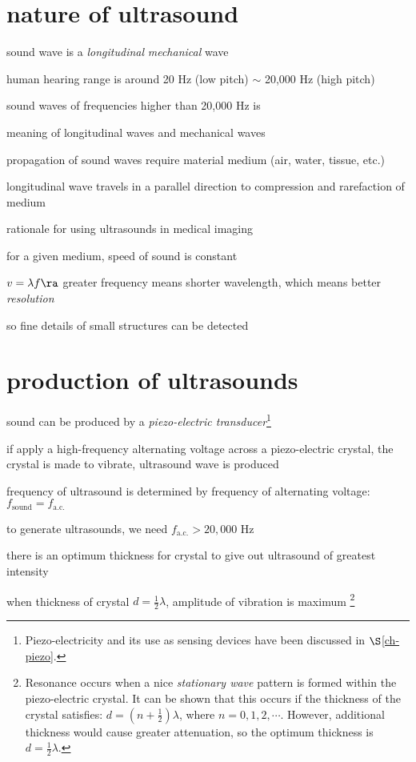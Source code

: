 \section{nature of ultrasound}

sound wave is a \emph{longitudinal} \emph{mechanical} wave

human hearing range is around 20 Hz (low pitch) $\sim$ 20,000 Hz (high pitch)

sound waves of frequencies higher than 20,000 Hz is 

\cmt meaning of longitudinal waves and mechanical waves
	
propagation of sound waves require material medium (air, water, tissue, etc.)
	
longitudinal wave travels in a parallel direction to compression and rarefaction of medium
	
\cmt rationale for using ultrasounds in medical imaging
	
for a given medium, speed of sound is constant

$v=\lambda f \ra$ greater frequency means shorter wavelength, which means better \emph{resolution}

so fine details of small structures can be detected


\section{production of ultrasounds}

sound can be produced by a \emph{piezo-electric transducer}\footnote{Piezo-electricity and its use as sensing devices have been discussed in $\S$\ref{ch-piezo}.}

if apply a high-frequency alternating voltage across a piezo-electric crystal, the crystal is made to vibrate, ultrasound wave is produced

\cmt frequency of ultrasound is determined by frequency of alternating voltage: $f_\text{sound} = f_\text{a.c.}$

to generate ultrasounds, we need $f_\text{a.c.} > 20,000 \text{ Hz}$

\cmt there is an optimum thickness for crystal to give out ultrasound of greatest intensity

when thickness of crystal $d=\frac{1}{2}\lambda$, amplitude of vibration is maximum
\footnote{Resonance occurs when a nice \emph{stationary wave} pattern is formed within the piezo-electric crystal. It can be shown that this occurs if the thickness of the crystal satisfies: $d=\left(n+\frac{1}{2}\right)\lambda$, where $n=0,1,2,\cdots$. However, additional thickness would cause greater attenuation, so the optimum thickness is $d=\frac{1}{2}\lambda$.}

